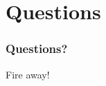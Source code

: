 \documentclass[handout]{beamer}
\begin{document}
\section{Questions}
\begin{frame}
	\frametitle{Questions?}
	\begin{center}
		Fire away!
	\end{center}
\end{frame}

\end{document}
